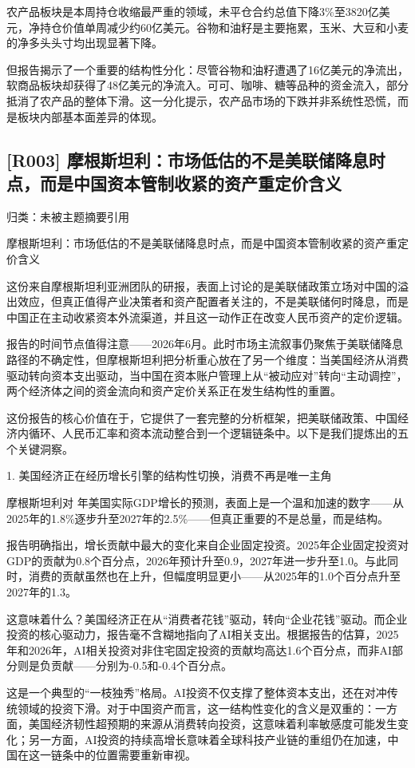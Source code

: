 \documentclass[11pt]{ctexart}
\begin{document}
农产品板块是本周持仓收缩最严重的领域，未平仓合约总值下降3\%至3820亿美元，净持仓价值单周减少约60亿美元。谷物和油籽是主要拖累，玉米、大豆和小麦的净多头头寸均出现显著下降。

但报告揭示了一个重要的结构性分化：尽管谷物和油籽遭遇了16亿美元的净流出，软商品板块却获得了48亿美元的净流入。可可、咖啡、糖等品种的资金流入，部分抵消了农产品的整体下滑。这一分化提示，农产品市场的下跌并非系统性恐慌，而是板块内部基本面差异的体现。

\subsection{[R003] 摩根斯坦利：市场低估的不是美联储降息时点，而是中国资本管制收紧的资产重定价含义}
{\small\color{refgray}归类：未被主题摘要引用}

摩根斯坦利：市场低估的不是美联储降息时点，而是中国资本管制收紧的资产重定价含义

这份来自摩根斯坦利亚洲团队的研报，表面上讨论的是美联储政策立场对中国的溢出效应，但真正值得产业决策者和资产配置者关注的，不是美联储何时降息，而是中国正在主动收紧资本外流渠道，并且这一动作正在改变人民币资产的定价逻辑。

报告的时间节点值得注意——2026年6月。此时市场主流叙事仍聚焦于美联储降息路径的不确定性，但摩根斯坦利把分析重心放在了另一个维度：当美国经济从消费驱动转向资本支出驱动，当中国在资本账户管理上从“被动应对”转向“主动调控”，两个经济体之间的资金流向和资产定价关系正在发生结构性的重置。

这份报告的核心价值在于，它提供了一套完整的分析框架，把美联储政策、中国经济内循环、人民币汇率和资本流动整合到一个逻辑链条中。以下是我们提炼出的五个关键洞察。

1. 美国经济正在经历增长引擎的结构性切换，消费不再是唯一主角

摩根斯坦利对 年美国实际GDP增长的预测，表面上是一个温和加速的数字——从2025年的1.8\%逐步升至2027年的2.5\%——但真正重要的不是总量，而是结构。

报告明确指出，增长贡献中最大的变化来自企业固定投资。2025年企业固定投资对GDP的贡献为0.8个百分点，2026年预计升至0.9，2027年进一步升至1.0。与此同时，消费的贡献虽然也在上升，但幅度明显更小——从2025年的1.0个百分点升至2027年的1.3。

这意味着什么？美国经济正在从“消费者花钱”驱动，转向“企业花钱”驱动。而企业投资的核心驱动力，报告毫不含糊地指向了AI相关支出。根据报告的估算，2025年和2026年，AI相关投资对非住宅固定投资的贡献均高达1.6个百分点，而非AI部分则是负贡献——分别为-0.5和-0.4个百分点。

这是一个典型的“一枝独秀”格局。AI投资不仅支撑了整体资本支出，还在对冲传统领域的投资下滑。对于中国资产而言，这一结构性变化的含义是双重的：一方面，美国经济韧性超预期的来源从消费转向投资，这意味着利率敏感度可能发生变化；另一方面，AI投资的持续高增长意味着全球科技产业链的重组仍在加速，中国在这一链条中的位置需要重新审视。
\end{document}
